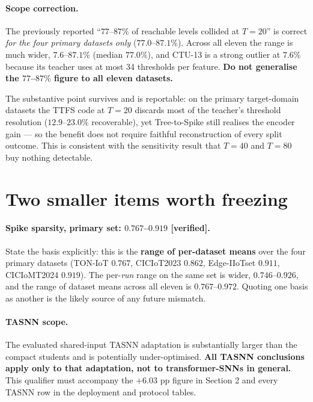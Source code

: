 \paragraph{$\!$Scope correction.} The previously reported ``$77$--$87\%$ of reachable
levels collided at $T=20$'' is correct \emph{for the four primary datasets only}
($77.0$--$87.1\%$). Across all eleven the range is much wider,
$\mathbf{7.6}$--$\mathbf{87.1\%}$ (median $77.0\%$), and CTU-13 is a strong outlier at
$7.6\%$ because its teacher uses at most 34 thresholds per feature. \textbf{Do not
generalise the $77$--$87\%$ figure to all eleven datasets.}

\noindent The substantive point survives and is reportable: on the primary target-domain
datasets the TTFS code at $T=20$ discards most of the teacher's threshold resolution
($12.9$--$23.0\%$ recoverable), yet Tree-to-Spike still realises the encoder gain --- so
the benefit does not require faithful reconstruction of every split outcome. This is
consistent with the sensitivity result that $T=40$ and $T=80$ buy nothing detectable.

\section*{Two smaller items worth freezing}

\paragraph{Spike sparsity, primary set: $0.767$--$0.919$ \textup{[verified]}.} State the
basis explicitly: this is the \textbf{range of per-dataset means} over the four primary
datasets (TON-IoT $0.767$, CICIoT2023 $0.862$, Edge-IIoTset $0.911$, CICIoMT2024
$0.919$). The per-\emph{run} range on the same set is wider, $0.746$--$0.926$, and the
range of dataset means across all eleven is $0.767$--$0.972$. Quoting one basis as another
is the likely source of any future mismatch.

\paragraph{TASNN scope.} The evaluated shared-input TASNN adaptation is substantially
larger than the compact students and is potentially under-optimised. \textbf{All TASNN
conclusions apply only to that adaptation, not to transformer-SNNs in general.} This
qualifier must accompany the $+6.03$ pp figure in Section 2 and every TASNN row in the
deployment and protocol tables.

